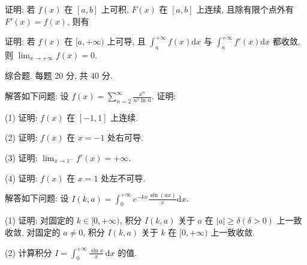 \par{}
证明: 若 $f(x)$ 在 $[a, b]$ 上可积, $F(x)$ 在 $[a, b]$ 上连续, 且除有限个点外有 $F'(x) = f(x)$, 则有\par
\nopagebreak[4]
证明: 若 $f(x)$ 在 $[a, +\infty)$ 上可导, 且 $\int_{a}^{+\infty} f(x) \mathrm{d}x$ 与 $\int_{a}^{+\infty} f'(x) \mathrm{d}x$ 都收敛, 则 $\lim_{x \to +\infty} f(x) = 0$.\par
\par{}
综合题. 每题 20 分, 共 40 分.\par
解答如下问题: 设 $f(x) = \sum_{n=2}^{\infty} \frac{x^n}{n^2 \ln n}$. 证明:\par
(1) 证明: $f(x)$ 在 $[-1, 1]$ 上连续.\par
(2) 证明: $f(x)$ 在 $x = -1$ 处右可导.\par
(3) 证明: $\lim_{x \to 1^{-}} f'(x) = +\infty$.\par
(4) 证明: $f(x)$ 在 $x = 1$ 处左不可导.\par
解答如下问题: 设 $I(k, a) = \int_{0}^{+\infty} e^{-kx} \frac{\sin(ax)}{x} \mathrm{d}x$.\par
(1) 证明: 对固定的 $k \in [0, +\infty)$, 积分 $I(k, a)$ 关于 $a$ 在 $|a| \geq \delta (\delta > 0)$ 上一致收敛, 对固定的 $a \neq 0$, 积分 $I(k, a)$ 关于 $k$ 在 $[0, +\infty)$ 上一致收敛.\par
(2) 计算积分 $I = \int_{0}^{+\infty} \frac{\sin x}{x} \, \mathrm{d}x$ 的值.\par
